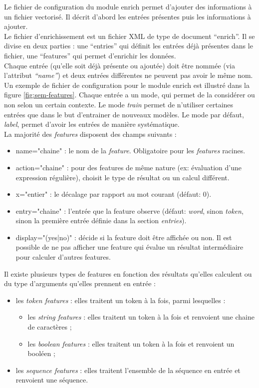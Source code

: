 \documentclass[manual-fr.tex]{subfiles}
\begin{document}
Le fichier de configuration du module enrich permet d'ajouter des informations à un fichier vectorisé. Il décrit d'abord les entrées présentes
puis les informations à ajouter.\\

Le fichier d'enrichissement est un fichier XML de type de document ``enrich''. Il se divise en deux parties : une ``entries'' qui définit les entrées déjà présentes dans le fichier, une ``features'' qui permet d'enrichir les données.\\

Chaque entrée (qu'elle soit déjà présente ou ajoutée) doit être nommée (via l'attribut \emph{``name''}) et deux entrées différentes ne peuvent pas avoir le même nom. Un exemple de fichier de configuration pour le module enrich est illustré dans la figure \ref{fig:sem-features}. Chaque entrée a un mode, qui permet de la considérer ou non selon un certain contexte. Le mode \textit{train} permet de n'utiliser certaines entrées que dans le but d'entrainer de nouveaux modèles. Le mode par défaut, \textit{label}, permet d'avoir les entrées de manière systématique.\\

La majorité des \textit{features} disposent des champs suivants :
\begin{itemize}
    \item name="chaine" : le nom de la \textit{feature}. Obligatoire pour les \textit{features} racines.
    \item action="chaine" : pour des features de même nature (ex: évaluation d'une expression régulière), choisit le type de résultat ou un calcul différent.
    \item x="entier" : le décalage par rapport au mot courant (défaut: 0).
    \item entry="chaine" : l'entrée que la feature observe (défaut: \textit{word}, sinon \textit{token}, sinon la première entrée définie dans la section \textit{entries}).
    \item display="(yes|no)" : décide si la feature doit être affichée ou non. Il est possible de ne pas afficher une feature qui évalue un résultat intermédiaire pour calculer d'autres features.
\end{itemize}

Il existe plusieurs types de features en fonction des résultats qu'elles calculent ou du type d'arguments qu'elles prennent en entrée :
\begin{itemize}
    \item les \textit{token features} : elles traitent un token à la fois, parmi lesquelles :
    \begin{itemize}
        \item les \textit{string features} : elles traitent un token à la fois et renvoient une chaine de caractères ;
        \item les \textit{boolean features} : elles traitent un token à la fois et renvoient un booléen ;
    \end{itemize}
    \item les \textit{sequence features} : elles traitent l'ensemble de la séquence en entrée et renvoient une séquence.
\end{itemize}
\end{document}
